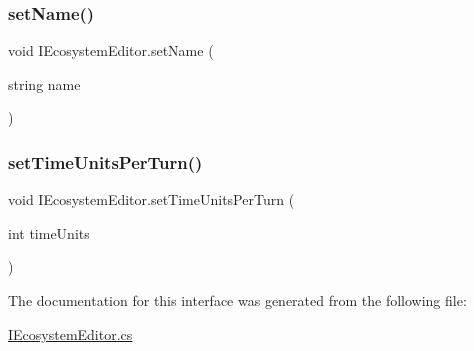 \mbox{\label{interface_i_ecosystem_editor_a4dabd8d8fcf4acab6e2345675a33724a}} 
\subsubsection{\texorpdfstring{set\+Name()}{setName()}}
{\footnotesize\ttfamily void I\+Ecosystem\+Editor.\+set\+Name (\begin{DoxyParamCaption}\item[{string}]{name }\end{DoxyParamCaption})}

\mbox{\label{interface_i_ecosystem_editor_ae05ed2195503dc3ee2aee5ef61116039}} 
\subsubsection{\texorpdfstring{set\+Time\+Units\+Per\+Turn()}{setTimeUnitsPerTurn()}}
{\footnotesize\ttfamily void I\+Ecosystem\+Editor.\+set\+Time\+Units\+Per\+Turn (\begin{DoxyParamCaption}\item[{int}]{time\+Units }\end{DoxyParamCaption})}



The documentation for this interface was generated from the following file\+:\begin{DoxyCompactItemize}
\item 
\mbox{\hyperlink{_i_ecosystem_editor_8cs}{I\+Ecosystem\+Editor.\+cs}}\end{DoxyCompactItemize}
